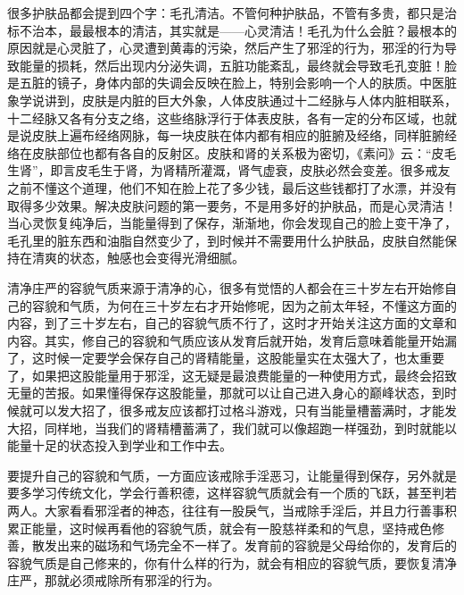 很多护肤品都会提到四个字：毛孔清洁。不管何种护肤品，不管有多贵，都只是治标不治本，最最根本的清洁，其实就是——心灵清洁！毛孔为什么会脏？最根本的原因就是心灵脏了，心灵遭到黄毒的污染，然后产生了邪淫的行为，邪淫的行为导致能量的损耗，然后出现内分泌失调，五脏功能紊乱，最终就会导致毛孔变脏！脸是五脏的镜子，身体内部的失调会反映在脸上，特别会影响一个人的肤质。中医脏象学说讲到，皮肤是内脏的巨大外象，人体皮肤通过十二经脉与人体内脏相联系，十二经脉又各有分支之络，这些络脉浮行于体表皮肤，各有一定的分布区域，也就是说皮肤上遍布经络网脉，每一块皮肤在体内都有相应的脏腑及经络，同样脏腑经络在皮肤部位也都有各自的反射区。皮肤和肾的关系极为密切，《素问》云：“皮毛生肾”，即言皮毛生于肾，为肾精所灌溉，肾气虚衰，皮肤必然会变差。很多戒友之前不懂这个道理，他们不知在脸上花了多少钱，最后这些钱都打了水漂，并没有取得多少效果。解决皮肤问题的第一要务，不是用多好的护肤品，而是心灵清洁！当心灵恢复纯净后，当能量得到了保存，渐渐地，你会发现自己的脸上变干净了，毛孔里的脏东西和油脂自然变少了，到时候并不需要用什么护肤品，皮肤自然能保持在清爽的状态，触感也会变得光滑细腻。

清净庄严的容貌气质来源于清净的心，很多有觉悟的人都会在三十岁左右开始修自己的容貌和气质，为何在三十岁左右才开始修呢，因为之前太年轻，不懂这方面的内容，到了三十岁左右，自己的容貌气质不行了，这时才开始关注这方面的文章和内容。其实，修自己的容貌和气质应该从发育后就开始，发育后意味着能量开始漏了，这时候一定要学会保存自己的肾精能量，这股能量实在太强大了，也太重要了，如果把这股能量用于邪淫，这无疑是最浪费能量的一种使用方式，最终会招致无量的苦报。如果懂得保存这股能量，那就可以让自己进入身心的巅峰状态，到时候就可以发大招了，很多戒友应该都打过格斗游戏，只有当能量槽蓄满时，才能发大招，同样地，当我们的肾精槽蓄满了，我们就可以像超跑一样强劲，到时就能以能量十足的状态投入到学业和工作中去。

要提升自己的容貌和气质，一方面应该戒除手淫恶习，让能量得到保存，另外就是要多学习传统文化，学会行善积德，这样容貌气质就会有一个质的飞跃，甚至判若两人。大家看看邪淫者的神态，往往有一股戾气，当戒除手淫后，并且力行善事积累正能量，这时候再看他的容貌气质，就会有一股慈祥柔和的气息，坚持戒色修善，散发出来的磁场和气场完全不一样了。发育前的容貌是父母给你的，发育后的容貌气质是自己修来的，你有什么样的行为，就会有相应的容貌气质，要恢复清净庄严，那就必须戒除所有邪淫的行为。

